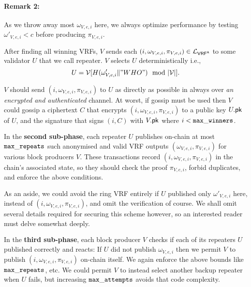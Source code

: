 \paragraph{Remark 2:} As we throw away most $\omega_{V,e,i}$ here, we always optimize performance by testing $ \omega'_{V,e,i} < c $ before producing $\pi_{V,e,i}$.  


After finding all winning VRFs,  $V$ sends each $(i,\omega_{V,e,i},\pi_{V,e,i}) \in \mathcal{L}_{\mathsf{VRF}^{\mathsf{A}}}$ to some validator $U$ that we call repeater. $ V $ selects $U$ deterministically i.e., 
$$ U = \mathcal{V}[H(\omega'_{V,e,i} \| "WHO") \mod |\mathcal{V}|]. $$



$ V $ should send $(i,\omega_{V,e,i},\pi_{V,e,i})$ to $U$ as directly as possible in always over \emph{an encrypted and authenticated} channel.  At worst, if gossip must be used then $V$ could gossip a ciphertext $C$ that encrypts $(i,\omega_{V,e,i},\pi_{V,e,i})$ to a public key $U.\mathsf{pk}$ of $U$, and the signature that signs $(i,C)$ with $V.\mathsf{pk}$ where $i < \mathtt{max\_winners}$.

In the {\bf second sub-phase}, each repeater $U$ publishes on-chain at most $\mathtt{max\_repeats}$ such anonymised and valid VRF outputs $(\omega_{V,e,i},\pi_{V,e,i})$ for various block producers $V$.  These transactions record $(i,\omega_{V,e,i},\pi_{V,e,i})$ in the chain's associated state, so they should check the proof $\pi_{V,e,i}$, forbid duplicates, and enforce the above conditions.

As an aside, we could avoid the ring VRF entirely if $U$ published only $\omega'_{V,e,i}$ here, instead of $(i,\omega_{V,e,i},\pi_{V,e,i})$, and omit the verification of course.  We shall omit several details required for securing this scheme however, so an interested reader must delve somewhat deeply.

In the {\bf third sub-phase}, each block producer $V$ checks if each of its repeaters $U$ published correctly and reacts:  If $U$ did not publish $\omega_{V,e,i}$ then we permit $V$ to publish $(i,\omega_{V,e,i},\pi_{V,e,i})$ on-chain itself.  We again enforce the above bounds like $\mathtt{max\_repeats}$, etc.  We could permit $V$ to instead select another backup repeater when $U$ fails, but increasing $\mathtt{max\_attempts}$ avoids that code complexity.

